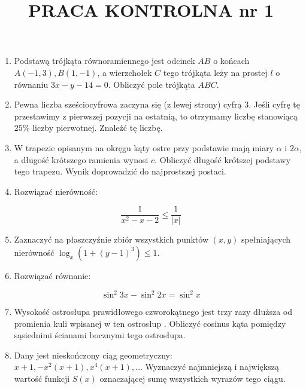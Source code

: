 \documentclass[10pt]{article}
\title{PRACA KONTROLNA nr 1 }
\author{}
\date{}
\begin{document}
\maketitle
\begin{enumerate}
  \item Podstawą trójkąta równoramiennego jest odcinek $\overline{A B}$ o końcach $A(-1,3), B(1,-1)$, a wierzchołek $C$ tego trójkąta leży na prostej $l$ o równaniu $3 x-y-14=0$. Obliczyć pole trójkąta $A B C$.
  \item Pewna liczba sześciocyfrowa zaczyna się (z lewej strony) cyfrą 3. Jeśli cyfrę tę przestawimy z pierwszej pozycji na ostatnią, to otrzymamy liczbę stanowiącą $25 \%$ liczby pierwotnej. Znaleźć tę liczbę.
  \item W trapezie opisanym na okręgu kąty ostre przy podstawie mają miary $\alpha$ i $2 \alpha$, a długość krótszego ramienia wynosi $c$. Obliczyć długość krótszej podstawy tego trapezu. Wynik doprowadzić do najprostszej postaci.
  \item Rozwiązać nierówność:
\end{enumerate}

$$
\frac{1}{x^{2}-x-2} \leqslant \frac{1}{|x|}
$$

\begin{enumerate}
  \setcounter{enumi}{4}
  \item Zaznaczyć na płaszczyźnie zbiór wszystkich punktów $(x, y)$ spełniających nierówność $\log _{x}\left(1+(y-1)^{3}\right) \leqslant 1$.
  \item Rozwiązać równanie:
\end{enumerate}

$$
\sin ^{2} 3 x-\sin ^{2} 2 x=\sin ^{2} x
$$

\begin{enumerate}
  \setcounter{enumi}{6}
  \item Wysokość ostrosłupa prawidłowego czworokątnego jest trzy razy dłuższa od promienia kuli wpisanej w ten ostrosłup . Obliczyć cosinus kąta pomiędzy sąsiednimi ścianami bocznymi tego ostrosłupa.
  \item Dany jest nieskończony ciąg geometryczny: $x+1,-x^{2}(x+1), x^{4}(x+1), \ldots$ Wyznaczyć najmniejszą i największą wartość funkcji $S(x)$ oznaczającej sumę wszystkich wyrazów tego ciągu.
\end{enumerate}
\end{document}
